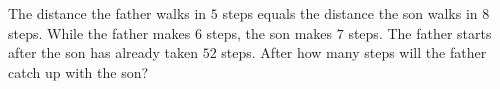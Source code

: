The distance the father walks in $5$ steps equals the distance the son walks in $8$ steps. While the father makes $6$ steps, the son makes $7$ steps. The father starts after the son has already taken $52$ steps. After how many steps will the father catch up with the son?
